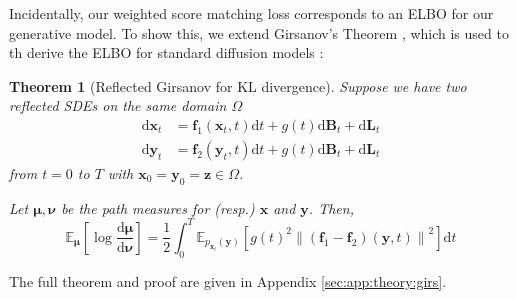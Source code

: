 \documentclass{article}
\theoremstyle{plain}
\newtheorem{theorem}{Theorem}[section]
\theoremstyle{definition}
\theoremstyle{remark}
\newcommand{\E}{\mathbb{E}}
\newcommand{\sqbrac}[1]{\left[#1\right]}
\newcommand{\norm}[1]{\left\|#1\right\|}
\renewcommand{\vec}{\mathbf}
\newcommand{\dd}{\mathrm{d}}
\begin{document}
Incidentally, our weighted score matching loss corresponds to an ELBO for our generative model. To show this, we extend Girsanov's Theorem \citep{ksendal1987StochasticDE}, which is used to th derive the ELBO for standard diffusion models \citep{Song2021MaximumLT,Kingma2021VariationalDM,Huang2021AVP}:
\begin{theorem}[Reflected Girsanov for KL divergence]\label{thm:reflgirsanov}
    Suppose we have two reflected SDEs on the same domain $\Omega$
    \begin{align}
        \dd \vec{x}_t &= \vec{f}_1(\vec{x}_t, t)\dd t + g(t) \dd \vec{B}_t + \dd \vec{L}_t\\
        \dd \vec{y}_t &= \vec{f}_2(\vec{y}_t, t)\dd t + g(t) \dd \vec{B}_t + \dd \vec{L}_t
    \end{align}
    from $t = 0$ to $T$ with $\vec{x}_0 = \vec{y}_0 = \vec{z} \in \Omega$. 
    
    Let $\bm{\mu}, \bm{\nu}$ be the path measures for (resp.) $\vec{x}$ and $\vec{y}$. Then,
    \begin{equation}\label{eqn:smgirs}
        \E_{\bm{\mu}}\sqbrac{\log \frac{\dd \bm{\mu}}{\dd \bm{\nu}}} = \frac{1}{2} \int_0^T\E_{p_{\vec{x}_t}(\vec{y})}\sqbrac{g(t)^2 \norm{(\vec{f}_1 - \vec{f}_2)(\vec{y}, t)}^2} \dd t
    \end{equation}
\end{theorem}
The full theorem and proof are given in Appendix \ref{sec:app:theory:girs}.
\end{document}
